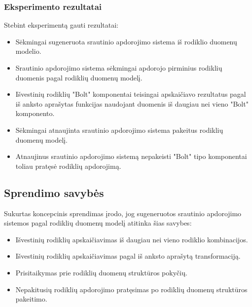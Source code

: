 \documentclass{VUMIFPSbakalaurinis}
\begin{document}
\subsubsection{Eksperimento rezultatai}
Stebint eksperimentą gauti rezultatai:
\begin{itemize}
    \item Sėkmingai sugeneruota srautinio apdorojimo sistema iš rodiklio duomenų modelio.
    \item Srautinio apdorojimo sistema sėkmingai apdorojo pirminius rodiklių duomenis pagal rodiklių duomenų modelį.
    \item Išvestinių rodiklių "Bolt" komponentai teisingai apskaičiavo rezultatus pagal iš anksto aprašytas funkcijas naudojant duomenis iš daugiau nei vieno "Bolt" komponento.
    \item Sėkmingai atnaujinta srautinio apdorojimo sistema pakeitus rodiklių duomenų modelį.
    \item Atnaujinus srautinio apdorojimo sistemą nepakeisti "Bolt" tipo komponentai toliau pratęsė rodiklių apdorojimą. 
\end{itemize}
\subsection{Sprendimo savybės}

Sukurtas koncepcinis sprendimas įrodo, jog sugeneruotos srautinio apdorojimo sistemos pagal rodiklių duomenų modelį atitinka šias savybes:
\begin{itemize}
    \item Išvestinių rodiklių apskaičiavimas iš daugiau nei vieno rodiklio kombinacijos.
    \item Išvestinių rodiklių apskaičiavimas pagal iš anksto aprašytą transformaciją.
    \item Prisitaikymas prie rodiklių duomenų struktūros pokyčių. 
    \item Nepakitusių rodiklių apdorojimo pratęsimas po rodiklių duomenų struktūros pakeitimo.
\end{itemize} 

\end{document}
